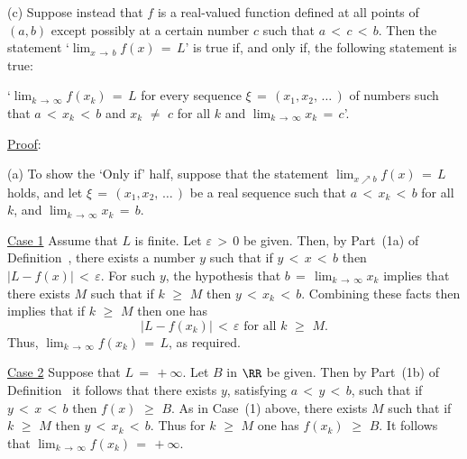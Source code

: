 {\V

        (c) Suppose instead that $f$ is a real-valued function defined at all points of $(a,b)$ except possibly at a certain number $c$ such that $a\,<\,c\,<\,b$.
    Then the statement `${\displaystyle \lim_{x \,{\rightarrow}\, b} f(x) \,=\, L}$' is true if, and only if, the following statement is true:

        `${\displaystyle \lim_{k \,{\rightarrow}\, {\infty}} f(x_{k}) \,=\, L}$ for every sequence ${\xi} \,=\, (x_{1},x_{2},\,{\ldots}\,)$ of numbers such that $a\,<\,x_{k}\,<\,b$ and $x_{k} \,\,{\neq}\,\, c$ for all $k$ and ${\displaystyle \lim_{k \,{\rightarrow}\, {\infty}} x_{k} \,=\, c}$'.

\V

        \underline{Proof}:

\V

        (a) To show the `Only if' half, suppose that the statement ${\displaystyle \lim_{x{\nearrow}b} f(x) \,=\, L}$ holds, and let ${\xi} \,=\, (x_{1},x_{2},\,{\ldots}\,)$
    be a real sequence such that $a\,<\,x_{k}\,<\,b$ for all $k$, and ${\displaystyle \lim_{k \,{\rightarrow}\, {\infty}} x_{k} \,=\, b}$.

        \underline{Case 1} Assume that $L$ is finite.
    Let ${\varepsilon}\,>\,0$ be given.
    Then, by Part~(1a) of Definition~, there exists a number $y$ such that if $y\,<\,x\,<\,b$ then $|L-f(x)|\,<\,{\varepsilon}$.
    For such $y$, the hypothesis that $b \,=\, \lim_{k \,{\rightarrow}\, {\infty}} x_{k}$ implies that there exists $M$ such that if $k\,\,{\geq}\,\,M$ then $y\,<\,x_{k}\,<\,b$.
    Combining these facts then implies that if $k\,\,{\geq}\,\,M$ then one has
        \begin{displaymath}
        |L-f(x_{k})|\,<\,{\varepsilon} \mbox{ for all $k\,\,{\geq}\,\,M$}.
        \end{displaymath}
    Thus, ${\displaystyle \lim_{k \,{\rightarrow}\, {\infty}} f(x_{k}) \,=\, L}$, as required.

        \underline{Case 2} Suppose that $L \,=\, +{\infty}$.
    Let $B$ in ${\RR}$ be given.
    Then by Part~(1b) of Definition~ it follows that there exists $y$, satisfying $a\,<\,y\,<\,b$,
    such that if $y\,<\,x\,<\,b$ then $f(x)\,\,{\geq}\,\,B$.
    As in Case~(1) above, there exists $M$ such that if $k\,\,{\geq}\,\,M$ then $y\,<\,x_{k}\,<\,b$.
    Thus for $k\,\,{\geq}\,\,M$ one has $f(x_{k})\,\,{\geq}\,\,B$.
    It follows that ${\displaystyle \lim_{k \,{\rightarrow}\, {\infty}} f(x_{k}) \,=\, +{\infty}}$.

}
